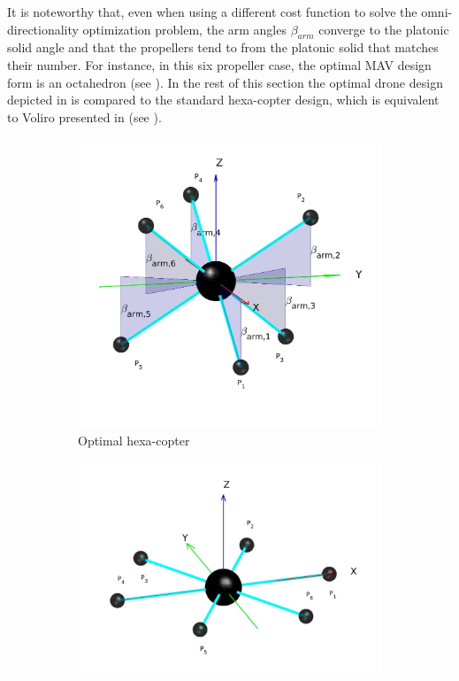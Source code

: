 It is noteworthy that, even when using a different cost function to solve
the omni-directionality optimization problem, the arm angles $\beta_{arm}$
converge to the platonic solid angle and that the propellers tend to from the
platonic solid that matches their number. For instance, in this six propeller case,
the optimal MAV design form is an octahedron (see ).
In the rest of this section the optimal drone design depicted in
 is compared to the standard hexa-copter design,
which is equivalent to Voliro presented in \citep{kamel_voliro:_2018}
(see ).

\begin{figure}[!ht]
  \begin{subfigure}[b]{0.45\textwidth}
    \centering
    \includegraphics[width=\linewidth]{images/Hexacopter.jpg}
    \caption{Optimal hexa-copter} \label{fig:Hexacopter_resulta}
  \end{subfigure}
  \hspace*{\fill} %
  \begin{subfigure}[b]{0.55\textwidth}
    \centering
    \includegraphics[width=\linewidth]{images/Voliro.jpg}

\end{subfigure}
\end{figure}

